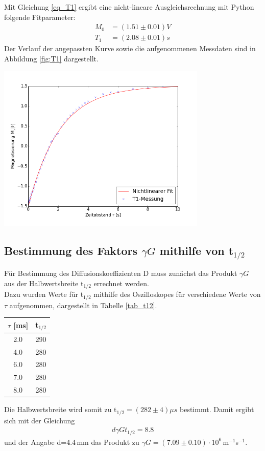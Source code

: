 \documentclass[]{scrartcl}
\begin{document}
Mit Gleichung \ref{eq_T1} ergibt eine nicht-lineare Ausgleichsrechnung mit Python folgende Fitparameter:
\begin{align*}
M_0&=(1.51 \pm 0.01)\si{V} \\
T_1&=(2.08 \pm 0.01)\si{s}
\end{align*}
Der Verlauf der angepassten Kurve sowie die aufgenommenen Messdaten sind in Abbildung \ref{fig:T1} dargestellt. 
\begin{center}
		\includegraphics[width=10cm]{images/plotT1.png}
		\label{fig:T1}
\end{center}

\subsection{Bestimmung des Faktors $\gamma G$ mithilfe von t$_{1/2}$}
Für Bestimmung des Diffusionskoeffizienten D muss zunächst das Produkt  $\gamma G$ aus der Halbwertsbreite t$_{1/2}$ errechnet werden. \\
Dazu wurden Werte für t$_{1/2}$ mithilfe des Oszilloskopes für verschiedene Werte von $\tau$ aufgenommen, dargestellt in Tabelle \ref{tab_t12}.
\begin{center}
	\begin{tabular}{|c|c|}
	\hline $\tau$ [ms] & t$_{1/2}$ \\
	\hline 2.0 & 290 \\
	\hline 4.0 & 280 \\
	\hline 6.0 & 280 \\
	\hline 7.0 & 280 \\
	\hline 8.0 & 280 \\
	\hline
	\end{tabular}
	\label{tab_t12}
\end{center}
Die Halbwertsbreite wird somit zu t$_{1/2}=(282 \pm 4) \mu s$ bestimmt. Damit ergibt sich mit der Gleichung 
\begin{align*}
d\gamma G t_{1/2} = 8.8
\end{align*}
und der Angabe d=4.4\,mm das Produkt zu $\gamma G=(7.09\pm0.10)\cdot 10^6\,$m$^{-1}$s$^{-1}$.
\end{document}
